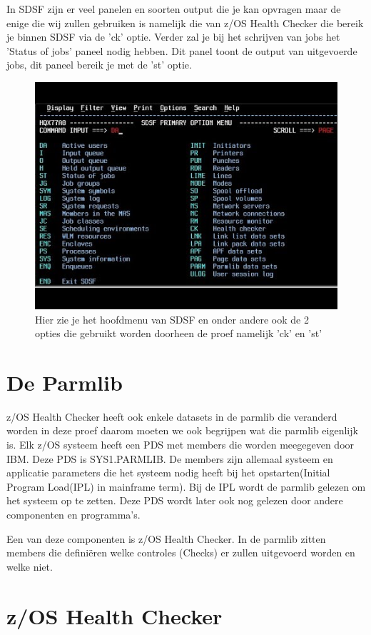 In SDSF zijn er veel panelen en soorten output die je kan opvragen maar de enige die wij zullen gebruiken is namelijk die van z/OS Health Checker die bereik je binnen SDSF via de 'ck' optie. Verder zal je bij het schrijven van jobs het 'Status of jobs' paneel nodig hebben. Dit panel toont de output van uitgevoerde jobs, dit paneel bereik je met de 'st' optie.

\begin{figure}[h]
	\centering
	\includegraphics[width=0.7\linewidth]{img/SDSF}
	\caption[SDSF Hoofdmenu]{Hier zie je het hoofdmenu van SDSF en onder andere ook de 2 opties die gebruikt worden doorheen de proef namelijk 'ck' en 'st'}
	\label{fig:sdsf}
\end{figure}

 
\section{De Parmlib}
\label{sec:De Parmlib}

z/OS Health Checker heeft ook enkele datasets in de parmlib die veranderd worden in deze proef daarom moeten we ook begrijpen wat die parmlib eigenlijk is. Elk z/OS systeem heeft een PDS met members die worden meegegeven door IBM. Deze PDS is SYS1.PARMLIB. De members zijn allemaal systeem en applicatie parameters die het systeem nodig heeft bij het opstarten(Initial Program Load(IPL) in mainframe term). Bij de IPL wordt de parmlib gelezen om het systeem op te zetten. Deze PDS wordt later ook nog gelezen door andere componenten en programma's. \cite{Cosimo2018}
 
Een van deze componenten is z/OS Health Checker. In de parmlib zitten members die definiëren welke controles (Checks) er zullen uitgevoerd worden en welke niet.
 
\section{z/OS Health Checker}
\label{sec:z/OS Health Checker}

